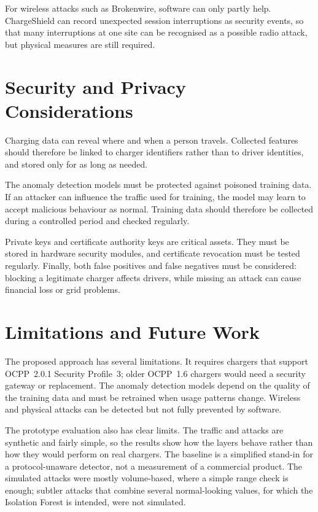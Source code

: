 \documentclass[runningheads]{llncs}
\begin{document}
For wireless attacks such as Brokenwire, software can only partly help. ChargeShield can record unexpected session interruptions as security events, so that many interruptions at one site can be recognised as a possible radio attack, but physical measures are still required.

\section{Security and Privacy Considerations}
Charging data can reveal where and when a person travels. Collected features should therefore be linked to charger identifiers rather than to driver identities, and stored only for as long as needed.

The anomaly detection models must be protected against poisoned training data. If an attacker can influence the traffic used for training, the model may learn to accept malicious behaviour as normal. Training data should therefore be collected during a controlled period and checked regularly.

Private keys and certificate authority keys are critical assets. They must be stored in hardware security modules, and certificate revocation must be tested regularly. Finally, both false positives and false negatives must be considered: blocking a legitimate charger affects drivers, while missing an attack can cause financial loss or grid problems.

\section{Limitations and Future Work}
The proposed approach has several limitations. It requires chargers that support OCPP~2.0.1 Security Profile~3; older OCPP~1.6 chargers would need a security gateway or replacement. The anomaly detection models depend on the quality of the training data and must be retrained when usage patterns change. Wireless and physical attacks can be detected but not fully prevented by software.

The prototype evaluation also has clear limits. The traffic and attacks are synthetic and fairly simple, so the results show how the layers behave rather than how they would perform on real chargers. The baseline is a simplified stand-in for a protocol-unaware detector, not a measurement of a commercial product. The simulated attacks were mostly volume-based, where a simple range check is enough; subtler attacks that combine several normal-looking values, for which the Isolation Forest is intended, were not simulated.
\end{document}
